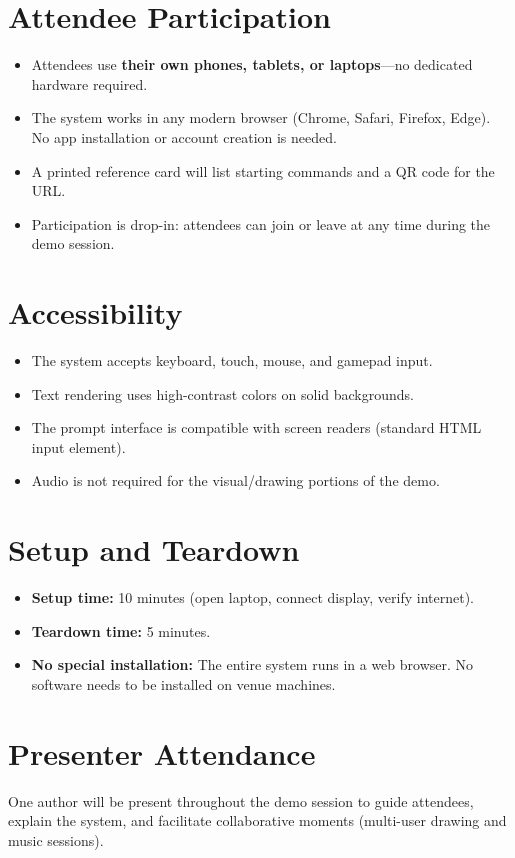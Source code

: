 \documentclass[manuscript,anonymous,review]{acmart}
\begin{document}
\section{Attendee Participation}

\begin{itemize}
  \item Attendees use \textbf{their own phones, tablets, or laptops}---no dedicated hardware required.
  \item The system works in any modern browser (Chrome, Safari, Firefox, Edge). No app installation or account creation is needed.
  \item A printed reference card will list starting commands and a QR code for the URL.
  \item Participation is drop-in: attendees can join or leave at any time during the demo session.
\end{itemize}

\section{Accessibility}

\begin{itemize}
  \item The system accepts keyboard, touch, mouse, and gamepad input.
  \item Text rendering uses high-contrast colors on solid backgrounds.
  \item The prompt interface is compatible with screen readers (standard HTML input element).
  \item Audio is not required for the visual/drawing portions of the demo.
\end{itemize}

\section{Setup and Teardown}

\begin{itemize}
  \item \textbf{Setup time:} 10 minutes (open laptop, connect display, verify internet).
  \item \textbf{Teardown time:} 5 minutes.
  \item \textbf{No special installation:} The entire system runs in a web browser. No software needs to be installed on venue machines.
\end{itemize}

\section{Presenter Attendance}

One author will be present throughout the demo session to guide attendees, explain the system, and facilitate collaborative moments (multi-user drawing and music sessions).
\end{document}
